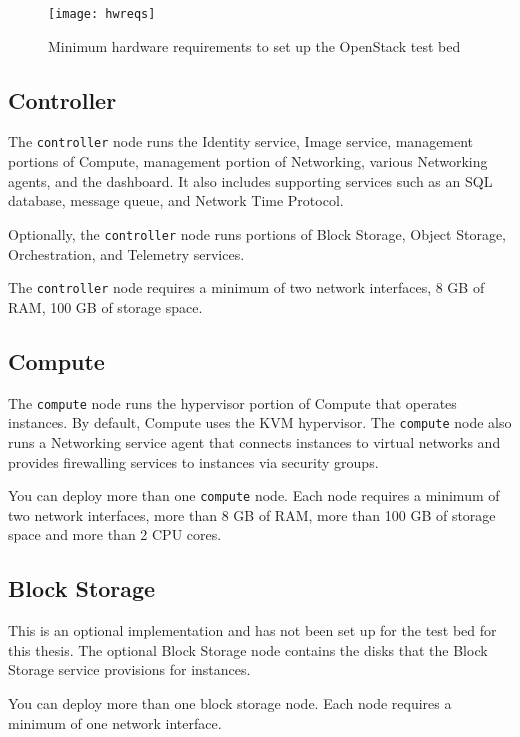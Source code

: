 \begin{figure}[H]
  \centering
  \texttt{[image: hwreqs]}
  \caption{Minimum hardware requirements to set up the OpenStack test bed\cite{OpenStack:hwreqs}}\label{fig:hwreqs}
  \vspace{-10pt}
\end{figure}


\subsection{Controller}\label{ssec:hwcontroller}
The \verb|controller| node runs the Identity service, Image service, management portions of Compute, management portion of Networking, various Networking agents, and the dashboard. It also includes supporting services such as an SQL database, message queue, and Network Time Protocol.

Optionally, the \verb|controller| node runs portions of Block Storage, Object Storage, Orchestration, and Telemetry services.

The \verb|controller| node requires a minimum of two network interfaces, 8 GB of RAM, 100 GB of storage space.

\subsection{Compute}\label{ssec:hwCompute}
The \verb|compute| node runs the hypervisor portion of Compute that operates instances.
By default, Compute uses the KVM hypervisor.
The \verb|compute| node also runs a Networking service agent that connects instances to virtual networks and provides firewalling services to instances via security groups.

You can deploy more than one \verb|compute| node.
Each node requires a minimum of two network interfaces,
more than 8 GB of RAM,
more than 100 GB of storage space and more than 2 CPU cores.

\subsection{Block Storage}\label{ssec:hwblockstorage}
This is an optional implementation and has not been set up for the test bed for this thesis.
The optional Block Storage node contains the disks that the Block Storage service provisions for instances.

You can deploy more than one block storage node.
Each node requires a minimum of one network interface.

